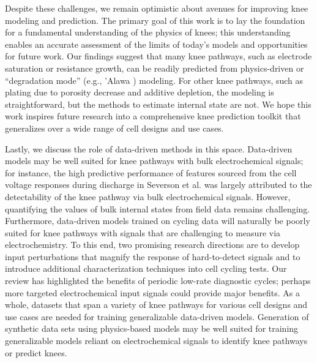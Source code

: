 \documentclass[journal=jpclcd,manuscript=article]{achemso}
\begin{document}
Despite these challenges, we remain optimistic about avenues for improving knee modeling and prediction. The primary goal of this work is to lay the foundation for a fundamental understanding of the physics of knees; this understanding enables an accurate assessment of the limits of today’s models and opportunities for future work. Our findings suggest that many knee pathways, such as electrode saturation or resistance growth, can be readily predicted from physics-driven or ``degradation mode'' (e.g., 'Alawa \cite{dubarry_synthesize_2012, dubarry_big_2020}) modeling. For other knee pathways, such as plating due to porosity decrease and additive depletion, the modeling is straightforward, but the methods to estimate internal state are not. We hope this work inspires future research into a comprehensive knee prediction toolkit that generalizes over a wide range of cell designs and use cases. 

Lastly, we discuss the role of data-driven methods in this space.
Data-driven models may be well suited for knee pathways with bulk electrochemical signals; for instance, the high predictive performance of features sourced from the cell voltage responses during discharge in Severson et al.\cite{severson_data-driven_2019} was largely attributed to the detectability of the knee pathway via bulk electrochemical signals.
However, quantifying the values of bulk internal states from field data remains challenging\cite{aitio_predicting_2021, bian_state--health_2021, sulzer_challenge_2021}.
Furthermore, data-driven models trained on cycling data will naturally be poorly suited for knee pathways with signals that are challenging to measure via electrochemistry.
To this end, two promising research directions are to develop input perturbations that magnify the response of hard-to-detect signals and to introduce additional characterization techniques into cell cycling tests.
Our review has highlighted the benefits of periodic low-rate diagnostic cycles; perhaps more targeted electrochemical input signals could provide major benefits.
As a whole, datasets that span a variety of knee pathways for various cell designs and use cases are needed for training generalizable data-driven models. Generation of synthetic data sets using physics-based models may be well suited for training generalizable models reliant on electrochemical signals to identify knee pathways or predict knees.\cite{dubarry_big_2020, kim_rapid_2021}
\end{document}
